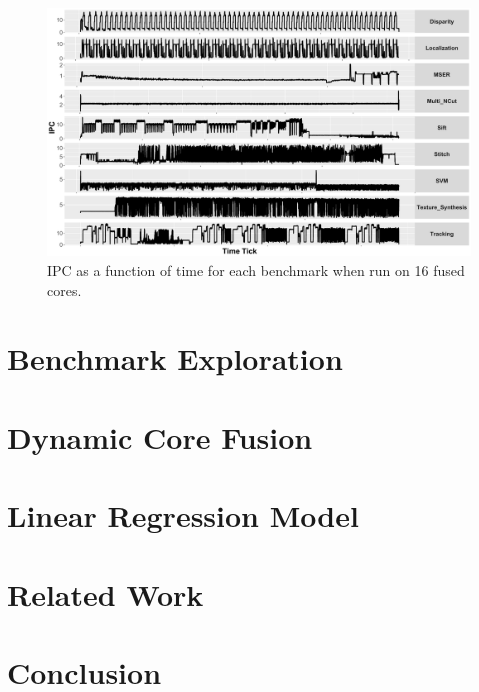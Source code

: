 \begin{figure}[t]
    \centering
    \includegraphics[width=1\textwidth]{cases-paper/graphics/Exploration/ipcs_16_2.pdf}
    \vspace*{-8mm}
    \caption{IPC as a function of time for each benchmark when run on 16 fused cores.}
    \label{fig:sxt}
\vspace{5mm}
\end{figure}

\vspace{5mm}
\section{Benchmark Exploration}\label{sec:expl}


\section{Dynamic Core Fusion}\label{sec:dynamic}



\section{Linear Regression Model}\label{sec:model}


\section{Related Work}\label{sec:related}


\section{Conclusion}\label{sec:conc}


